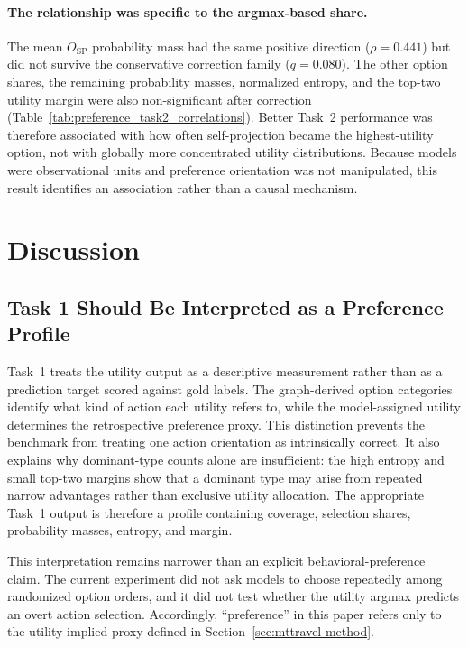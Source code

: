 \documentclass[pdflatex,sn-mathphys-num]{sn-jnl}%
\theoremstyle{thmstyleone}%
\theoremstyle{thmstyletwo}%
\theoremstyle{thmstylethree}%
\begin{document}
\paragraph{The relationship was specific to the argmax-based share.}
The mean $O_{\mathrm{SP}}$ probability mass had the same positive direction ($\rho=0.441$) but did not survive the conservative correction family ($q=0.080$). The other option shares, the remaining probability masses, normalized entropy, and the top-two utility margin were also non-significant after correction (Table~\ref{tab:preference_task2_correlations}). Better Task~2 performance was therefore associated with how often self-projection became the highest-utility option, not with globally more concentrated utility distributions. Because models were observational units and preference orientation was not manipulated, this result identifies an association rather than a causal mechanism.

\FloatBarrier

\section{Discussion}
\label{sec:mttravel-discussion}

\subsection{Task 1 Should Be Interpreted as a Preference Profile}

Task~1 treats the utility output as a descriptive measurement rather than as a prediction target scored against gold labels. The graph-derived option categories identify what kind of action each utility refers to, while the model-assigned utility determines the retrospective preference proxy. This distinction prevents the benchmark from treating one action orientation as intrinsically correct. It also explains why dominant-type counts alone are insufficient: the high entropy and small top-two margins show that a dominant type may arise from repeated narrow advantages rather than exclusive utility allocation. The appropriate Task~1 output is therefore a profile containing coverage, selection shares, probability masses, entropy, and margin.

This interpretation remains narrower than an explicit behavioral-preference claim. The current experiment did not ask models to choose repeatedly among randomized option orders, and it did not test whether the utility argmax predicts an overt action selection. Accordingly, ``preference'' in this paper refers only to the utility-implied proxy defined in Section~\ref{sec:mttravel-method}.
\end{document}
